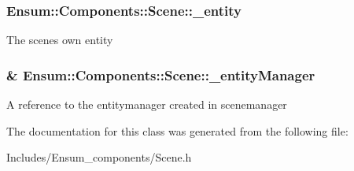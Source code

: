 \subsubsection[{\texorpdfstring{\+\_\+entity}{_entity}}]{ Ensum\+::\+Components\+::\+Scene\+::\+\_\+entity\hspace{0.3cm}{\ttfamily [protected]}}\hypertarget{class_ensum_1_1_components_1_1_scene_a8d36e81874a5b07e3edbd8720b8b289e}{}\label{class_ensum_1_1_components_1_1_scene_a8d36e81874a5b07e3edbd8720b8b289e}
The scenes own entity 
\subsubsection[{\texorpdfstring{\+\_\+entity\+Manager}{_entityManager}}]{\& Ensum\+::\+Components\+::\+Scene\+::\+\_\+entity\+Manager\hspace{0.3cm}{\ttfamily [protected]}}\hypertarget{class_ensum_1_1_components_1_1_scene_af7eb8e3279c5b6768f442ae05b44e75f}{}\label{class_ensum_1_1_components_1_1_scene_af7eb8e3279c5b6768f442ae05b44e75f}
A reference to the entitymanager created in scenemanager 

The documentation for this class was generated from the following file\+:\begin{DoxyCompactItemize}
\item 
Includes/\+Ensum\+\_\+components/Scene.\+h\end{DoxyCompactItemize}
